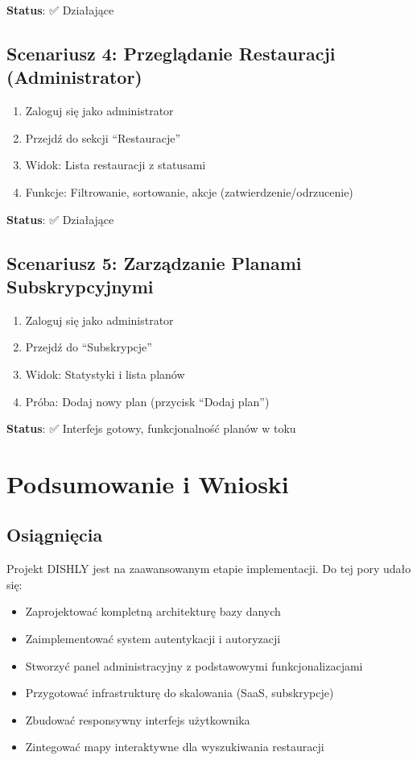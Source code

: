 \documentclass[12pt,a4paper,utf-8]{article}
\begin{document}
\textbf{Status}: ✅ Działające

\subsection{Scenariusz 4: Przeglądanie Restauracji (Administrator)}

\begin{enumerate}
    \item Zaloguj się jako administrator
    \item Przejdź do sekcji ``Restauracje''
    \item Widok: Lista restauracji z statusami
    \item Funkcje: Filtrowanie, sortowanie, akcje (zatwierdzenie/odrzucenie)
\end{enumerate}

\textbf{Status}: ✅ Działające

\subsection{Scenariusz 5: Zarządzanie Planami Subskrypcyjnymi}

\begin{enumerate}
    \item Zaloguj się jako administrator
    \item Przejdź do ``Subskrypcje''
    \item Widok: Statystyki i lista planów
    \item Próba: Dodaj nowy plan (przycisk ``Dodaj plan'')
\end{enumerate}

\textbf{Status}: ✅ Interfejs gotowy, funkcjonalność planów w toku

\newpage

\section{Podsumowanie i Wnioski}

\subsection{Osiągnięcia}

Projekt DISHLY jest na zaawansowanym etapie implementacji. Do tej pory udało się:

\begin{itemize}
    \item Zaprojektować kompletną architekturę bazy danych
    \item Zaimplementować system autentykacji i autoryzacji
    \item Stworzyć panel administracyjny z podstawowymi funkcjonalizacjami
    \item Przygotować infrastrukturę do skalowania (SaaS, subskrypcje)
    \item Zbudować responsywny interfejs użytkownika
    \item Zintegować mapy interaktywne dla wyszukiwania restauracji
\end{itemize}
\end{document}
